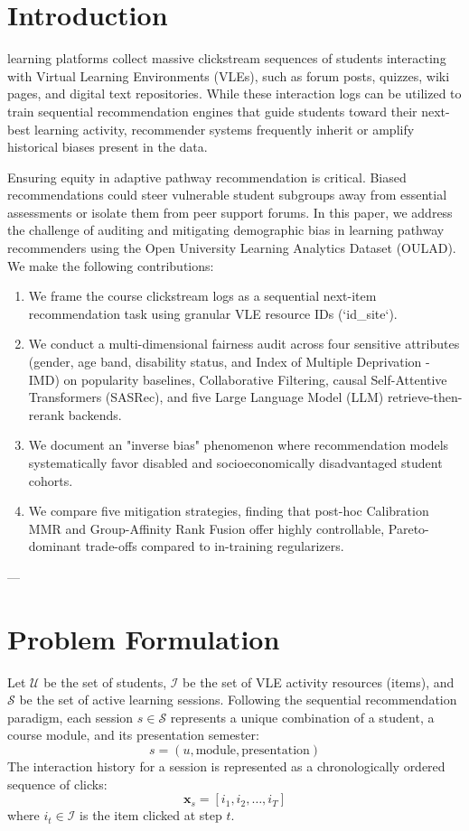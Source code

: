\documentclass[10pt,journal,compsoc]{IEEEtran}
\begin{document}
\IEEEdisplaynontitleabstractindextext
\IEEEpeerreviewmaketitle

\section{Introduction}
 learning platforms collect massive clickstream sequences of students interacting with Virtual Learning Environments (VLEs), such as forum posts, quizzes, wiki pages, and digital text repositories. While these interaction logs can be utilized to train sequential recommendation engines that guide students toward their next-best learning activity, recommender systems frequently inherit or amplify historical biases present in the data.

Ensuring equity in adaptive pathway recommendation is critical. Biased recommendations could steer vulnerable student subgroups away from essential assessments or isolate them from peer support forums. In this paper, we address the challenge of auditing and mitigating demographic bias in learning pathway recommenders using the Open University Learning Analytics Dataset (OULAD). We make the following contributions:
\begin{enumerate}
    \item We frame the course clickstream logs as a sequential next-item recommendation task using granular VLE resource IDs (`id_site`).
    \item We conduct a multi-dimensional fairness audit across four sensitive attributes (gender, age band, disability status, and Index of Multiple Deprivation - IMD) on popularity baselines, Collaborative Filtering, causal Self-Attentive Transformers (SASRec), and five Large Language Model (LLM) retrieve-then-rerank backends.
    \item We document an "inverse bias" phenomenon where recommendation models systematically favor disabled and socioeconomically disadvantaged student cohorts.
    \item We compare five mitigation strategies, finding that post-hoc Calibration MMR and Group-Affinity Rank Fusion offer highly controllable, Pareto-dominant trade-offs compared to in-training regularizers.
\end{enumerate}

---

\section{Problem Formulation}
Let $\mathcal{U}$ be the set of students, $\mathcal{I}$ be the set of VLE activity resources (items), and $\mathcal{S}$ be the set of active learning sessions. Following the sequential recommendation paradigm, each session $s \in \mathcal{S}$ represents a unique combination of a student, a course module, and its presentation semester:
$$s = (u, \text{module}, \text{presentation})$$
The interaction history for a session is represented as a chronologically ordered sequence of clicks:
$$\mathbf{x}_s = [i_1, i_2, \dots, i_T]$$
where $i_t \in \mathcal{I}$ is the item clicked at step $t$.
\end{document}
